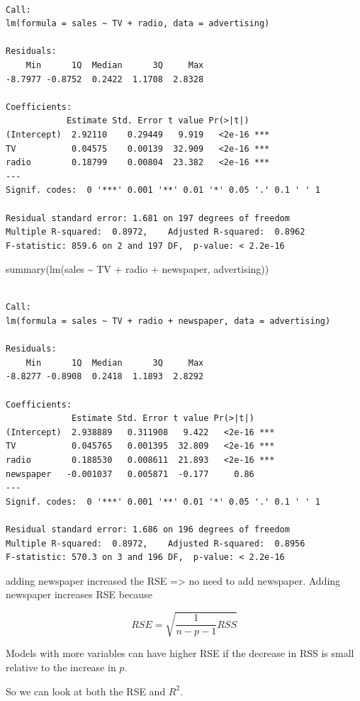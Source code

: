 \documentclass[
  letterpaper,
  DIV=11,
  numbers=noendperiod]{scrreprt}
\newenvironment{Shaded}{\begin{snugshade}}{\end{snugshade}}
\newcommand{\FunctionTok}[1]{\textcolor[rgb]{0.28,0.35,0.67}{#1}}
\newcommand{\NormalTok}[1]{\textcolor[rgb]{0.00,0.23,0.31}{#1}}
\newcommand{\SpecialCharTok}[1]{\textcolor[rgb]{0.37,0.37,0.37}{#1}}
\begin{document}
\begin{verbatim}

Call:
lm(formula = sales ~ TV + radio, data = advertising)

Residuals:
    Min      1Q  Median      3Q     Max 
-8.7977 -0.8752  0.2422  1.1708  2.8328 

Coefficients:
            Estimate Std. Error t value Pr(>|t|)    
(Intercept)  2.92110    0.29449   9.919   <2e-16 ***
TV           0.04575    0.00139  32.909   <2e-16 ***
radio        0.18799    0.00804  23.382   <2e-16 ***
---
Signif. codes:  0 '***' 0.001 '**' 0.01 '*' 0.05 '.' 0.1 ' ' 1

Residual standard error: 1.681 on 197 degrees of freedom
Multiple R-squared:  0.8972,    Adjusted R-squared:  0.8962 
F-statistic: 859.6 on 2 and 197 DF,  p-value: < 2.2e-16
\end{verbatim}

\begin{Shaded}
\begin{Highlighting}[]
\FunctionTok{summary}\NormalTok{(}\FunctionTok{lm}\NormalTok{(sales }\SpecialCharTok{\textasciitilde{}}\NormalTok{ TV }\SpecialCharTok{+}\NormalTok{ radio }\SpecialCharTok{+}\NormalTok{ newspaper, advertising))}
\end{Highlighting}
\end{Shaded}

\begin{verbatim}

Call:
lm(formula = sales ~ TV + radio + newspaper, data = advertising)

Residuals:
    Min      1Q  Median      3Q     Max 
-8.8277 -0.8908  0.2418  1.1893  2.8292 

Coefficients:
             Estimate Std. Error t value Pr(>|t|)    
(Intercept)  2.938889   0.311908   9.422   <2e-16 ***
TV           0.045765   0.001395  32.809   <2e-16 ***
radio        0.188530   0.008611  21.893   <2e-16 ***
newspaper   -0.001037   0.005871  -0.177     0.86    
---
Signif. codes:  0 '***' 0.001 '**' 0.01 '*' 0.05 '.' 0.1 ' ' 1

Residual standard error: 1.686 on 196 degrees of freedom
Multiple R-squared:  0.8972,    Adjusted R-squared:  0.8956 
F-statistic: 570.3 on 3 and 196 DF,  p-value: < 2.2e-16
\end{verbatim}

adding newspaper increased the RSE =\textgreater{} no need to add
newspaper. Adding newspaper increases RSE because

\[
RSE = \sqrt{\frac{1}{n-p-1}RSS}
\]

Models with more variables can have higher RSE if the decrease in RSS is
small relative to the increase in \(p\).

So we can look at both the RSE and \(R^2\).
\end{document}
